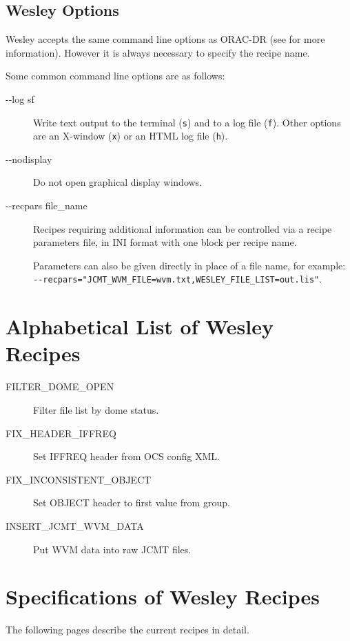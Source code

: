 \documentclass[twoside,11pt,nolof]{starlink}
\begin{document}

\subsection{Wesley Options}

Wesley accepts the same command line options as ORAC-DR
(see \oracdrsun{} for more information).
However it is always necessary to specify the recipe name.

Some common command line options are as follows:

\begin{description}
\item[-{}-log sf] \mbox{}

Write text output to the terminal (\texttt{s}) and to a log file
(\texttt{f}).
Other options are an X-window (\texttt{x}) or an HTML log file (\texttt{h}).

\item[-{}-nodisplay] \mbox{}

Do not open graphical display windows.

\item[-{}-recpars file\_name] \mbox{}

Recipes requiring additional information can be controlled via
a recipe parameters file, in INI format with one block per recipe name.

Parameters can also be given directly in place of a file name,
for example:
\\ \texttt{-{}-recpars="JCMT\_WVM\_FILE=wvm.txt,WESLEY\_FILE\_LIST=out.lis"}.

\end{description}

\newpage
\appendix

\section{Alphabetical List of Wesley Recipes\label{ap:list}}

\begin{description}
\item[FILTER\_DOME\_OPEN] \mbox {}
Filter file list by dome status.

\item[FIX\_HEADER\_IFFREQ] \mbox {}
Set IFFREQ header from OCS config XML.

\item[FIX\_INCONSISTENT\_OBJECT] \mbox {}
Set OBJECT header to first value from group.

\item[INSERT\_JCMT\_WVM\_DATA] \mbox{}
Put WVM data into raw JCMT files.
\end{description}

\newpage

\section{Specifications of Wesley Recipes\label{ap:full}}

The following pages describe the current \wesley{} recipes in detail.


\end{document}
